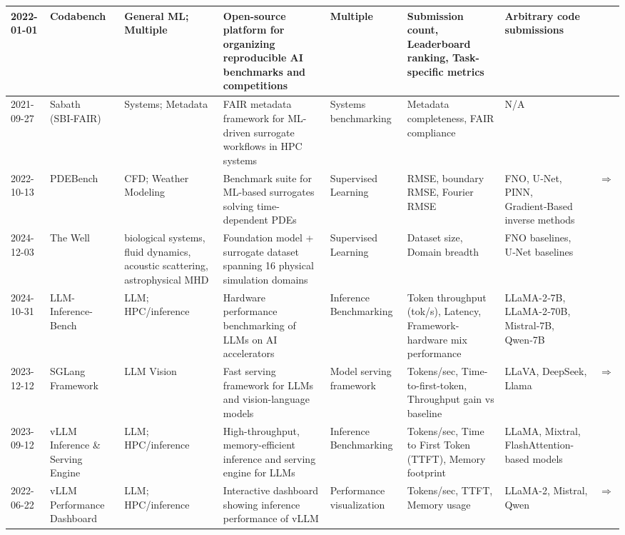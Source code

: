 \documentclass{article}
\begin{document}
\begin{landscape}
{\begin{longtable}{|p{1.5cm}|p{2.5cm}|p{2cm}|p{2cm}|p{3cm}|p{2cm}|p{2cm}|p{1cm}|}
2022-01-01 & Codabench & General ML; Multiple & Open-source platform for organizing reproducible AI benchmarks and competitions & Multiple & Submission count, Leaderboard ranking, Task-specific metrics & Arbitrary code submissions & \cite{xu2021codabench} \\ \hline
2021-09-27 & Sabath (SBI‑FAIR) & Systems; Metadata & FAIR metadata framework for ML-driven surrogate workflows in HPC systems & Systems benchmarking & Metadata completeness, FAIR compliance & N/A & \cite{luszczek2021sabath} \\ \hline
2022-10-13 & PDEBench & CFD; Weather Modeling & Benchmark suite for ML-based surrogates solving time-dependent PDEs & Supervised Learning & RMSE, boundary RMSE, Fourier RMSE & FNO, U‑Net, PINN, Gradient‑Based inverse methods & \cite{takamoto2022pdebench} \href{https://arxiv.org/abs/2210.07182}{$\Rightarrow$ } \\ \hline
2024-12-03 & The Well & biological systems, fluid dynamics, acoustic scattering, astrophysical MHD & Foundation model + surrogate dataset spanning 16 physical simulation domains & Supervised Learning & Dataset size, Domain breadth & FNO baselines, U‑Net baselines & \cite{ohana2024well} \\ \hline
2024-10-31 & LLM-Inference-Bench & LLM; HPC/inference & Hardware performance benchmarking of LLMs on AI accelerators & Inference Benchmarking & Token throughput (tok/s), Latency, Framework-hardware mix performance & LLaMA-2‑7B, LLaMA-2‑70B, Mistral‑7B, Qwen‑7B & \cite{chitty2024llm} \\ \hline
2023-12-12 & SGLang Framework & LLM Vision & Fast serving framework for LLMs and vision-language models & Model serving framework & Tokens/sec, Time-to-first-token, Throughput gain vs baseline & LLaVA, DeepSeek, Llama & \cite{zheng2023sglang} \href{https://arxiv.org/abs/2312.07104}{$\Rightarrow$ } \\ \hline
2023-09-12 & vLLM Inference \& Serving Engine & LLM; HPC/inference & High-throughput, memory-efficient inference and serving engine for LLMs & Inference Benchmarking & Tokens/sec, Time to First Token (TTFT), Memory footprint & LLaMA, Mixtral, FlashAttention-based models & \cite{kwon2023efficient} \\ \hline
2022-06-22 & vLLM Performance Dashboard & LLM; HPC/inference & Interactive dashboard showing inference performance of vLLM & Performance visualization & Tokens/sec, TTFT, Memory usage & LLaMA-2, Mistral, Qwen & \cite{mo2024vllm_dashboard} \href{https://simon-mo-workspace.observablehq.cloud/vllm-dashboard-v0/}{$\Rightarrow$ } \\ \hline

\end{longtable}}
\end{landscape}
\end{document}
